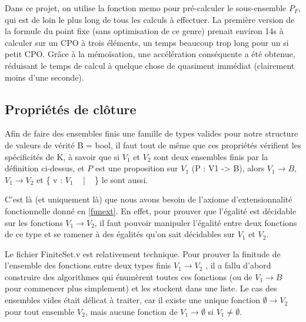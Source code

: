 \documentclass{article}
\newcommand\code[1]{{\fontfamily{lmtt}\selectfont #1}}
\theoremstyle{definition}
\begin{document}
 Dans ce projet, on utilise la fonction \code{memo} pour pré-calculer le sous-ensemble $P_F$, qui est de loin le plus long de tous les calculs à effectuer. La première version de la formule du point fixe (sans optimisation de ce genre) prenait environ 14s à calculer sur un CPO à trois éléments, un temps beaucoup trop long pour un si petit CPO. Grâce à la mémoïsation, une accélération conséquente a été obtenue, réduisant le temps de calcul à quelque chose de quasiment immédiat (clairement moins d'une seconde).


\subsection{Propriétés de clôture}
\label{cloture}

Afin de faire des ensembles finis une famille de types valides pour notre structure de valeurs de vérité \code{B = bool}, il faut tout de même que ces propriétés vérifient les spécificités de \code{K}, à savoir que si $V_1$ et $V_2$ sont deux ensembles finis par la définition ci-dessus, et $P$ est une proposition sur $V_1$ (\code{P : V1 -> B}), alors $V_1 \rightarrow B$, $V_1 \rightarrow V_2$ et
\{ v : $V_1$ ~ | ~ \text{\code{is\_true(P v)}} \} le sont aussi.

C'est là (et uniquement là) que nous avons besoin de l'axiome d'extensionnalité fonctionnelle donné en \ref{funext}. En effet, pour prouver que l'égalité est décidable sur les fonctions $V_1 \rightarrow V_2$, il faut pouvoir manipuler l'égalité entre deux fonctions de ce type et se ramener à des égalités qu'on sait décidables sur $V_1$ et $V_2$. %

\medskip

Le fichier \code{FiniteSet.v} est relativement technique. Pour prouver la finitude de l'ensemble des fonctions entre deux types finis $V_1 \rightarrow V_2$ , il a fallu d'abord construire des algorithmes qui énumèrent toutes ces fonctions (ou de $V_1 \rightarrow B$ pour commencer plus simplement) et les stockent dans une liste. Le cas des ensembles vides était délicat à traiter, car il existe une unique fonction $\emptyset \rightarrow V_2$ pour tout ensemble $V_2$, mais aucune fonction de $V_1 \rightarrow \emptyset$ si $V_1 \neq \emptyset$. 

\end{document}
